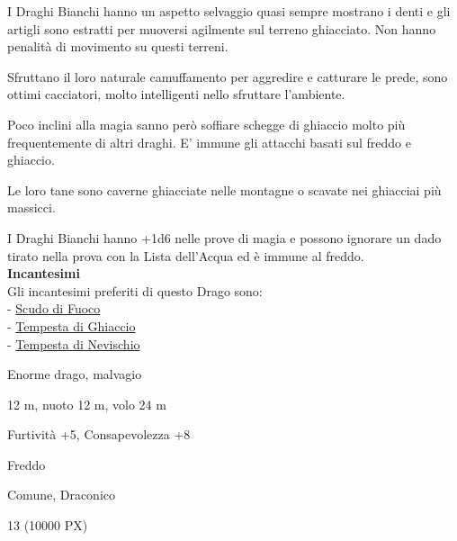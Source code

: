 \begin{multicols}{2}
{I Draghi Bianchi hanno un aspetto selvaggio quasi sempre mostrano i denti e gli artigli sono estratti per muoversi agilmente sul terreno ghiacciato.
Non hanno penalità di movimento su questi terreni.

Sfruttano il loro naturale camuffamento per aggredire e catturare le prede, sono ottimi cacciatori, molto intelligenti nello sfruttare l'ambiente.

Poco inclini alla magia sanno però soffiare schegge di ghiaccio molto più frequentemente di altri draghi. E' immune gli attacchi basati sul freddo e ghiaccio.

Le loro tane sono caverne ghiacciate nelle montagne o scavate nei ghiacciai più massicci.

I Draghi Bianchi hanno +1d6 nelle prove di magia e possono ignorare un dado tirato nella prova con la Lista dell'Acqua ed è immune al freddo.\\

\textbf{Incantesimi}\\
Gli incantesimi preferiti di questo Drago sono:\\
- \hyperlink{Scudo di Fuoco}{Scudo di Fuoco}\\
- \hyperlink{Tempesta di Ghiaccio}{Tempesta di Ghiaccio}\\
- \hyperlink{Tempesta di Nevischio}{Tempesta di Nevischio}

\begin{description}[noitemsep, topsep=0pt, parsep=0pt, partopsep=0pt, itemsep=1pt, leftmargin=2.35cm,  labelwidth=2.2cm, itemindent=0cm, listparindent=0pt] %
\setlength{\baselineskip}{10pt}
\item[\textbf{Taglia/Tipo}] Enorme drago, malvagio
\item[\textbf{Caratt.}] 
\item[\textbf{Punti Ferita}] 
\item[\textbf{Movimento}] 12 m, nuoto 12 m, volo 24 m
\item[\textbf{Tiri Salvez.}] 
\item[\textbf{Comp.}] Furtività +5, Consapevolezza +8
\item[\textbf{Imm. Danni}] Freddo
\item[\textbf{Sensi}] 
\item[\textbf{Linguaggi}] Comune, Draconico
\item[\textbf{Sfida}] 13 (10000 PX)
\end{description}
\smallskip

}
\end{multicols}
